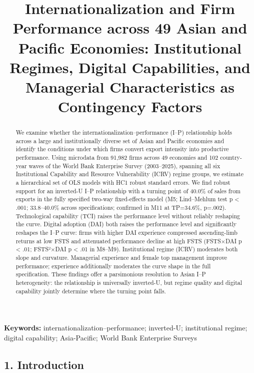 \documentclass[
  12pt,a4paper]{article}
\title{Internationalization and Firm Performance across 49 Asian and
Pacific Economies: Institutional Regimes, Digital Capabilities, and
Managerial Characteristics as Contingency Factors}
\author{}
\date{}
\begin{document}
\maketitle
\begin{abstract}
We examine whether the internationalization--performance (I--P)
relationship holds across a large and institutionally diverse set of
Asian and Pacific economies and identify the conditions under which
firms convert export intensity into productive performance. Using
microdata from 91,982 firms across 49 economies and 102 country-year
waves of the World Bank Enterprise Survey (2003--2025), spanning all six
Institutional Capability and Resource Vulnerability (ICRV) regime
groups, we estimate a hierarchical set of OLS models with HC1 robust
standard errors. We find robust support for an inverted-U I--P
relationship with a turning point of 40.0\% of sales from exports in the
fully specified two-way fixed-effects model (M5; Lind--Mehlum test p
\textless{} .001; 33.8--40.0\% across specifications; confirmed in M11
at TP=34.6\%, p=.002). Technological capability (TCI) raises the
performance level without reliably reshaping the curve. Digital adoption
(DAI) both raises the performance level and significantly reshapes the
I--P curve: firms with higher DAI experience compressed ascending-limb
returns at low FSTS and attenuated performance decline at high FSTS
(FSTS×DAI p \textless{} .01; FSTS²×DAI p \textless{} .01 in M8--M9).
Institutional regime (ICRV) moderates both slope and curvature.
Managerial experience and female top management improve performance;
experience additionally moderates the curve shape in the full
specification. These findings offer a parsimonious resolution to Asian
I--P heterogeneity: the relationship is universally inverted-U, but
regime quality and digital capability jointly determine where the
turning point falls.
\end{abstract}

\textbf{Keywords:} internationalization--performance; inverted-U;
institutional regime; digital capability; Asia-Pacific; World Bank
Enterprise Surveys

\hypertarget{introduction}{%
\subsection{1. Introduction}\label{introduction}}
\end{document}
